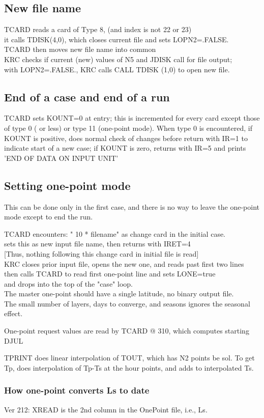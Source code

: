 \documentclass[draft]{article}  %
\newcommand{\qi}{\\ \hspace*{2.em}}      %
\newcommand{\qii}{\\ \hspace*{4.em}}     %
\begin{document}
\subsection{New file name}%
TCARD reads a card of Type 8, (and index is not 22 or 23)
\qi it calls  TDISK(4,0), which closes current file and sets  LOPN2=.FALSE.
\qii   TCARD then moves new file name into common \\
KRC checks if current (new) values of N5 and JDISK call for file output;
\qi  with  LOPN2=.FALSE., KRC calls CALL TDISK (1,0) to open new file.

\subsection{End of a case and end of a run}%
TCARD sets KOUNT=0 at entry; this is incremented for every card except those of
type 0 ( or less) or type 11 (one-point mode). When type 0 is encountered, if
KOUNT is positive, does normal check of changes before return with IR=1 to
indicate start of a new case; if KOUNT is zero, returns with IR=5 and prints
'END OF DATA ON INPUT UNIT'

\subsection{Setting one-point mode}%
This can be done only in the first case, and there is no way to leave the 
one-point mode except to end the run.

TCARD encounters: " 10 * filename" as change card in the initial case.
\qi   sets this as new input file name, then returns with IRET=4 
\qi  [Thus, nothing following this change card in initial file is read] \\
KRC closes prior input file, opens the new one, and reads past first two lines 
\qi     then calls TCARD to read first one-point line and sets LONE=true
\qi     and drops into the top of the "case" loop. \\ 
The master one-point should have a single latitude, no binary output file. \\
The small number of layers, days to converge, and seasons ignores the seasonal 
effect.

One-point request values are read by TCARD @ 310, which computes starting DJUL

TPRINT does linear interpolation of TOUT, which has N2 points be sol. To get Tp,
does interpolation of Tp-Ts at the hour points, and adds to interpolated Ts.
 \subsubsection{How one-point converts Ls to date}
 Ver 212: 
XREAD is the 2nd column in the OnePoint file, i.e., Ls. 
\end{document}
